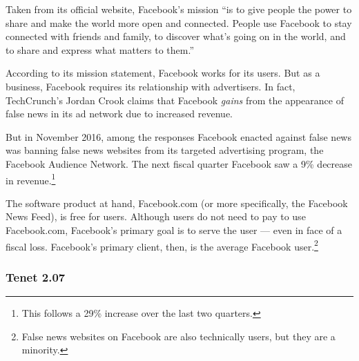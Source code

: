 \par Taken from its official website, Facebook's mission ``is to give people the power to share and make the world more open and connected. People use Facebook to stay connected with friends and family, to discover what’s going on in the world, and to share and express what matters to them.'' \cite{fb_newsroom}
\par According to its mission statement, Facebook works for its users. But as a business, Facebook requires its relationship with advertisers. In fact, TechCrunch's Jordan Crook claims that Facebook \emph{gains} from the appearance of false news in its ad network due to increased revenue.  \cite{tc_responsibility}
\par But in November 2016, among the responses Facebook enacted against false news was banning false news websites from its targeted advertising program, the Facebook Audience Network. \cite{tc_ban} The next fiscal quarter Facebook saw a 9\% decrease in revenue.\footnote{This follows a 29\% increase over the last two quarters.} \cite{tc_ban,fb_4q2016,fb_1q2017} 
\par The software product at hand, Facebook.com (or more specifically, the Facebook News Feed), is free for users. Although users do not need to pay to use Facebook.com, Facebook's primary goal is to serve the user --- even in face of a fiscal loss. Facebook's primary client, then, is the average Facebook user.\footnote{False news websites on Facebook are also technically users, but they are a minority.}

\vfill

\subsubsection{Tenet 2.07}


\label{issue}


